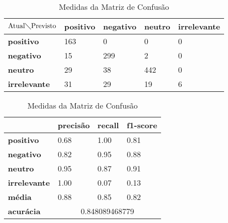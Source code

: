 \begin{table}[h!]
\centering
\begin{minipage}[b]{0.45\linewidth}
\caption{Matriz de Confusão Quaternário: \textit{Random Forest}}
\label{tab:mcb-nb}
\begin{tabular}{|l|l|l|l|l|}
\hline
$\textrm{Atual}\diagdown\textrm{Previsto}$ & \textbf{positivo} & \textbf{negativo} & \textbf{neutro} & \textbf{irrelevante}\\ \hline
\textbf{positivo} & 163 & 0 & 0 & 0\\ \hline
\textbf{negativo} & 15 & 299 & 2 & 0\\ \hline
\textbf{neutro} & 29 & 38 & 442 & 0\\ \hline
\textbf{irrelevante} & 31 & 29 & 19 & 6\\ \hline
\end{tabular}
\end{minipage}
\hspace{0.5cm}
\begin{minipage}[b]{0.45\linewidth}

\centering
\caption{Medidas da Matriz de Confusão}
\label{tab:mmcb-nb}
\begin{tabular}{|l|l|l|l|}
\hline
         & \textbf{precisão} & \textbf{recall} & \textbf{f1-score} \\ \hline
\textbf{positivo} & 0.68     & 1.00   & 0.81     \\ \hline
\textbf{negativo} & 0.82     & 0.95   & 0.88     \\ \hline
\textbf{neutro} & 0.95     & 0.87   & 0.91     \\ \hline
\textbf{irrelevante} & 1.00     & 0.07   & 0.13     \\ \hline
\textbf{média} & 0.88     & 0.85   & 0.82     \\ \hline
\textbf{acurácia} & \multicolumn{3}{|c|}{0.848089468779}\\ \hline
\end{tabular}
\end{minipage}
\end{table}